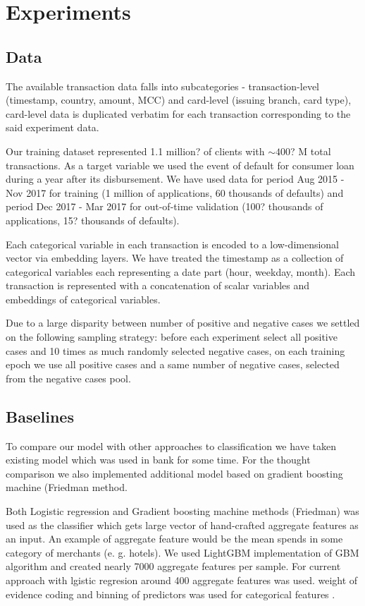\documentclass{sigkddExp}
\begin{document}
\section{Experiments}
\subsection{Data}

The available transaction data falls into subcategories - transaction-level (timestamp, country, amount, MCC) and card-level (issuing branch, card type), card-level data is duplicated verbatim for each transaction corresponding to the said experiment data.

Our training dataset represented 1.1 million? of clients with $\sim400$? M total transactions. As a target variable we used the event of default for consumer loan during a year after its disbursement.
We have used data for period Aug 2015 - Nov 2017 for training  (1 million of applications, 60 thousands of defaults) and period Dec 2017 - Mar 2017 for out-of-time validation (100? thousands of applications, 15? thousands of defaults).

Each categorical variable in each transaction is encoded to a low-dimensional vector via embedding layers. We have treated the timestamp as a collection of categorical variables each representing a date part (hour, weekday, month). Each transaction is represented with a concatenation of scalar variables and embeddings of categorical variables.

Due to a large disparity between number of positive and negative cases we settled on the following sampling strategy: before each experiment select all positive cases and 10 times as much randomly selected negative cases, on each training epoch we use all positive cases and a same number of negative cases, selected from the negative cases pool.



\subsection{Baselines}

To compare our model with other approaches to classification we have taken existing model which was used in bank for some time. For the thought comparison we also implemented additional model based on gradient boosting machine (Friedman\cite{friedman2001greedy} method.

Both Logistic regression  and Gradient boosting machine methods (Friedman\cite{friedman2001greedy}) was used as the classifier which gets large vector of hand-crafted aggregate features as an input. An example of aggregate feature would be the mean spends in some category of merchants (e. g. hotels).
We used LightGBM\cite{Ke2017LightGBMAH} implementation of GBM algorithm and created nearly 7000 aggregate features per sample. For current approach with lgistic regresion around 400 aggregate features was used. weight of evidence coding and binning of predictors was used for categorical features \cite{lund2016woe}. 
\end{document}
